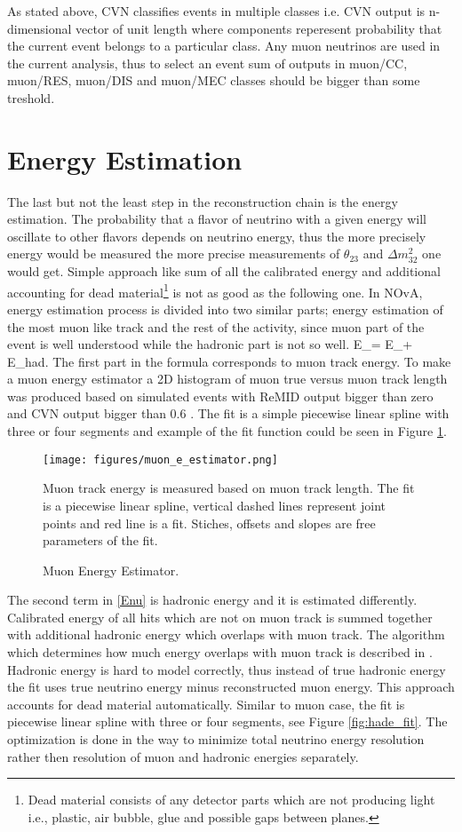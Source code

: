 As stated above, CVN classifies events in multiple classes i.e. CVN output is n-dimensional vector of unit length
where components reperesent probability that the current event belongs to a particular class. Any muon neutrinos
are used in the current analysis, thus to select an event sum of outputs in muon/CC, muon/RES, muon/DIS and 
muon/MEC classes should be bigger than some treshold.

\section{Energy Estimation}
The last but not the least step in the reconstruction chain is the energy estimation. The probability that a 
flavor of neutrino with a given energy will oscillate to other flavors depends on neutrino energy, thus the more 
precisely energy would be measured the more precise measurements of $\theta_{23}$ and $\Delta m_{32}^2$ one 
would get. Simple approach like sum of all the calibrated  energy and additional accounting for dead 
material\footnote{Dead material consists of any detector parts which are not producing light i.e., plastic, air 
bubble, glue and possible gaps between planes.} is not as good as the following one. In NOvA, energy estimation 
process is divided into two similar parts; energy estimation of the most muon like track and the rest of the 
activity, since muon part of the event is well understood while the hadronic part is not so well.
\be
E_\nu = E_\mu + E_{had}.
\ee 
The first part in the formula corresponds to muon track energy. To make a muon energy estimator a 2D histogram of 
muon true versus muon track length was produced based on simulated events with ReMID output bigger than zero and
CVN output bigger than 0.6 \cite{energy_technote}. The fit is a simple piecewise linear spline with three or 
four segments and example of the fit function could be seen in Figure \ref{fig:mue_fit}.
\begin{figure}[t]
\texttt{[image: figures/muon\_e\_estimator.png]}
\centering
\caption{Muon Energy Estimator.}
{Muon track energy is measured based on muon track length. The fit is a piecewise linear spline, vertical dashed
lines represent joint points and red line is a fit. Stiches, offsets and slopes are free parameters of the fit.}
\label{fig:mue_fit}
\end{figure}

The second term in \ref{Enu} is hadronic energy and it is estimated differently. Calibrated energy of all hits 
which are not on muon track is summed together with additional hadronic energy which overlaps with muon track. 
The algorithm which determines how much energy overlaps with muon track is described in \cite{Kanika}. Hadronic
energy is hard to model correctly, thus instead of true hadronic energy the fit uses true neutrino energy minus
reconstructed muon energy. This approach accounts for dead material automatically. Similar to muon case, the fit 
is piecewise linear spline with three or four segments, see Figure \ref{fig:hade_fit}. The optimization is done
in the way to minimize total neutrino energy resolution rather then resolution of muon and hadronic energies 
separately. 


